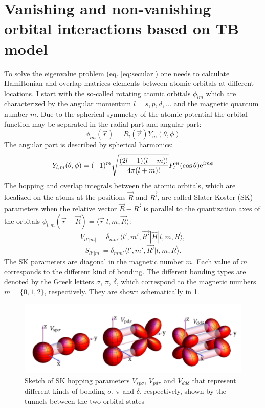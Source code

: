 \section{Vanishing and non-vanishing orbital interactions based on TB model}
To solve the eigenvalue problem (eq. \ref{eq:secular}) one needs to calculate Hamiltonian and overlap matrices elements between atomic orbitals at different locations. I start with the so-called rotating atomic orbitals $\phi_{lm}$ which are characterized by the angular momentum $l = {s, p, d, ...}$ and the magnetic quantum number $m$. Due to the spherical symmetry of the atomic potential the orbital function may be separated in the radial part and angular part:
\begin{equation}
	\phi_{lm}(\vec{r}) = R_l(\vec{r}) Y_m(\theta, \phi)
\end{equation}
The angular part is described by spherical harmonics:
\begin{equation}
	Y_{l,m}(\theta, \phi) = (-1)^m \sqrt{\frac{(2l + 1)(l-m)!}{4 \pi (l+m)!}} P_l^m(\cos{\theta})\mathrm{e}^{i m \phi}
\end{equation}
The hopping and overlap integrals between the atomic orbitals, which are localized on the atoms at the positions $\vec{R}$ and $\vec{R'}$, are called Slater-Koster (SK) parameters\cite{slatter} when the relative vector $\vec{R}-\vec{R'}$ is parallel to the quantization axes of the orbitals $\phi_{l,m}(\vec{r} - \vec{R}) = \langle \vec{r} | l, m, \vec{R} \rangle$: 
\begin{equation}
	V_{ll'|m|} = \delta_{mm'}\langle l', m', \vec{R'} | \hat{H} | l, m , \vec{R} \rangle, 
\end{equation}
\begin{equation}
	S_{ll'|m|} = \delta_{mm'}\langle l', m', \vec{R'} | l, m , \vec{R} \rangle.
\end{equation}
The SK parameters are diagonal in the magnetic number $m$. Each value of $m$ corresponds to the different kind of bonding. The different bonding types are denoted by the Greek letters $\sigma$, $\pi$, $\delta$, which correspond to the magnetic numbers $m = \{ 0, 1, 2 \}$, respectively. They are shown schematically in \ref{fig:orbitals}. 
\begin{figure}[hb]
  \includegraphics[width=\linewidth]{img/orbitals}
  \caption[caption]{Sketch of SK hopping parameters $V_{sp\sigma}$, $V_{pd\pi}$ and $V_{dd\delta}$ that represent different kinds of bonding $\sigma$, $\pi$ and $\delta$, respectively, shown by the tunnels between the two orbital states\footnotemark \label{fig:orbitals}}
\end{figure}

